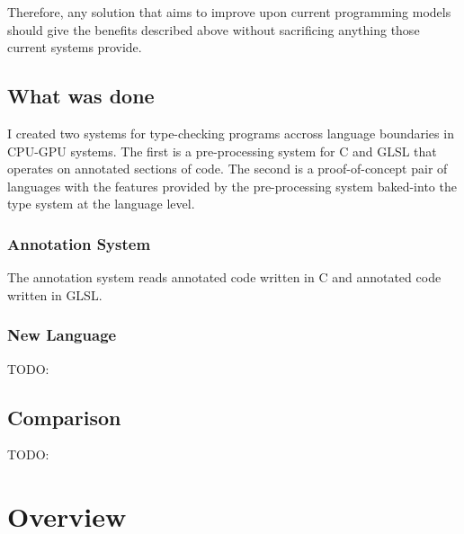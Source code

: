 \documentclass[a4paper,12pt,twoside,openright]{report}
\begin{document}
Therefore, any solution that aims to improve upon current programming models
should give the benefits described above without sacrificing anything those
current systems provide.

\subsection{What was done}

I created two systems for type-checking programs accross language boundaries in
CPU-GPU systems. The first is a pre-processing system for C and GLSL that
operates on annotated sections of code. The second is a proof-of-concept pair
of languages with the features provided by the pre-processing system baked-into
the type system at the language level.

\subsubsection{Annotation System}

The annotation system reads annotated code written in C and annotated code
written in GLSL.


\subsubsection{New Language}

TODO:

\subsection{Comparison}

TODO:


\section{Overview}



\end{document}
